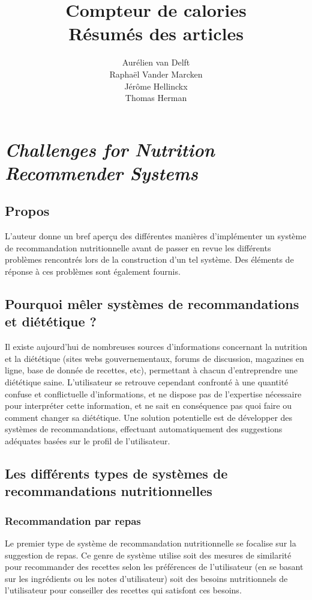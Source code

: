\documentclass[a4paper, 11pt]{article}
\title{\Huge{Compteur de calories}\\  \Large Résumés des articles}
\author{Aurélien van Delft\\Raphaël Vander Marcken\\Jérôme Hellinckx\\Thomas Herman}
\begin{document}
\maketitle
\tableofcontents
\glsaddall
\printglossaries

\newpage
\section{\textit{Challenges for Nutrition Recommender Systems}}
\subsection{Propos}
L'auteur donne un bref aperçu des différentes manières d'implémenter un système de recommandation nutritionnelle avant de passer en revue les différents problèmes rencontrés lors de la construction d'un tel système. Des éléments de réponse à ces problèmes sont également fournis.
\subsection{Pourquoi mêler systèmes de recommandations et diététique ?}
Il existe aujourd'hui de nombreuses sources d'informations concernant la nutrition et la diététique (sites webs gouvernementaux, forums de discussion, magazines en ligne, base de donnée de recettes, etc), permettant à chacun d'entreprendre une diététique saine. L'utilisateur se retrouve cependant confronté à une quantité confuse et conflictuelle d'informations, et ne dispose pas de l'expertise nécessaire pour interpréter cette information, et ne sait en conséquence pas quoi faire ou comment changer sa diététique. Une solution potentielle est de développer des systèmes de recommandations, effectuant automatiquement des suggestions adéquates basées sur le profil de l'utilisateur. 

\subsection{Les différents types de systèmes de recommandations nutritionnelles}
\subsubsection{Recommandation par repas}
Le premier type de système de recommandation nutritionnelle se focalise sur la suggestion de repas. Ce genre de système utilise soit des mesures de similarité pour recommander des recettes selon les préférences de l'utilisateur (en se basant sur les ingrédients ou les notes d'utilisateur) soit des besoins nutritionnels de l'utilisateur pour conseiller des recettes qui satisfont ces besoins.
\end{document}
